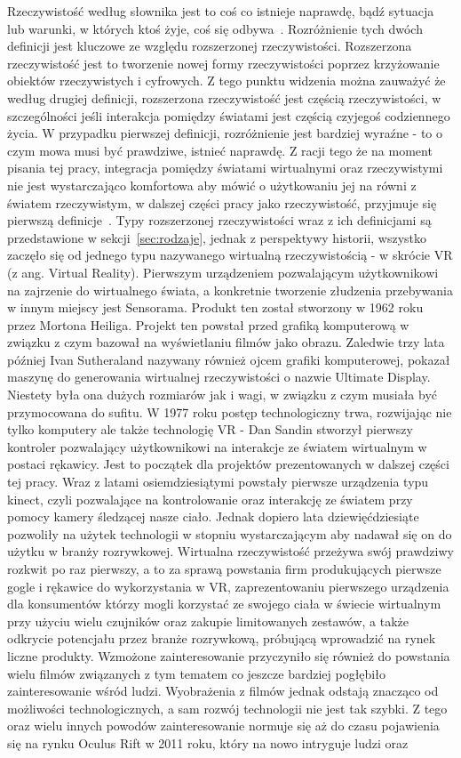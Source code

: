 Rzeczywistość według słownika jest to coś co istnieje naprawdę, bądź sytuacja lub warunki, w których ktoś żyje, coś się odbywa~\cite{sjp1}. Rozróżnienie tych dwóch definicji jest kluczowe ze względu rozszerzonej rzeczywistości. Rozszerzona rzeczywistość jest to tworzenie nowej formy rzeczywistości poprzez krzyżowanie obiektów rzeczywistych i cyfrowych. Z tego punktu widzenia można zauważyć że według drugiej definicji, rozszerzona rzeczywistość jest częścią rzeczywistości, w szczególności jeśli interakcja pomiędzy światami jest częścią czyjegoś codziennego życia. W przypadku pierwszej definicji, rozróżnienie jest bardziej wyraźne - to o czym mowa musi być prawdziwe, istnieć naprawdę. Z racji tego że na moment pisania tej pracy, integracja pomiędzy światami wirtualnymi oraz rzeczywistymi nie jest wystarczająco komfortowa aby mówić o użytkowaniu jej na równi z światem rzeczywistym, w dalszej części pracy jako rzeczywistość, przyjmuje się pierwszą definicje~\cite{XR}. Typy rozszerzonej rzeczywistości wraz z ich definicjami są przedstawione w sekcji~\ref{sec:rodzaje}, jednak z perspektywy historii, wszystko zaczęło się od jednego typu nazywanego wirtualną rzeczywistością - w skrócie VR (z ang. Virtual Reality). Pierwszym urządzeniem pozwalającym użytkownikowi na zajrzenie do wirtualnego świata, a konkretnie tworzenie złudzenia przebywania w innym miejscy jest Sensorama. Produkt ten został stworzony w 1962 roku przez Mortona Heiliga. Projekt ten powstał przed grafiką komputerową w związku z czym bazował na wyświetlaniu filmów jako obrazu. Zaledwie trzy lata później Ivan Sutheraland nazywany również ojcem grafiki komputerowej, pokazał maszynę do generowania wirtualnej rzeczywistości o nazwie Ultimate Display. Niestety była ona dużych rozmiarów jak i wagi, w związku z czym musiała być przymocowana do sufitu. W 1977 roku postęp technologiczny trwa, rozwijając nie tylko komputery ale także technologię VR - Dan Sandin stworzył pierwszy kontroler pozwalający użytkownikowi na interakcje ze światem wirtualnym w postaci rękawicy. Jest to początek dla projektów prezentowanych w dalszej części tej pracy. Wraz z latami osiemdziesiątymi powstały pierwsze urządzenia typu kinect, czyli pozwalające na kontrolowanie oraz interakcję ze światem przy pomocy kamery śledzącej nasze ciało. Jednak dopiero lata dziewięćdziesiąte pozwoliły na użytek technologii w stopniu wystarczającym aby nadawał się on do użytku w branży rozrywkowej. Wirtualna rzeczywistość przeżywa swój prawdziwy rozkwit po raz pierwszy, a to za sprawą powstania firm produkujących pierwsze gogle i rękawice do  wykorzystania w VR, zaprezentowaniu pierwszego urządzenia dla konsumentów którzy mogli korzystać ze swojego ciała w świecie wirtualnym przy użyciu wielu czujników oraz zakupie limitowanych zestawów, a także odkrycie potencjału przez branże rozrywkową, próbującą wprowadzić na rynek liczne produkty. Wzmożone zainteresowanie przyczyniło się również do powstania wielu filmów związanych z tym tematem co jeszcze bardziej pogłębiło zainteresowanie wśród ludzi. Wyobrażenia z filmów jednak odstają znacząco od możliwości technologicznych, a sam rozwój technologii nie jest tak szybki. Z tego oraz wielu innych powodów zainteresowanie normuje się aż do czasu pojawienia się na rynku Oculus Rift  w 2011 roku, który na nowo intryguje ludzi oraz 